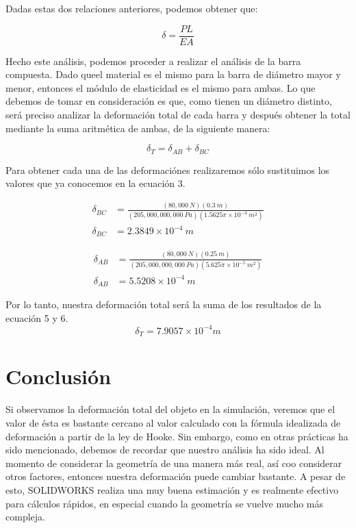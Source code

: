 \documentclass[12pt, letterpaper]{article}
\begin{document}
Dadas estas dos relaciones anteriores, podemos obtener que:

\begin{equation}
	\delta = \frac{PL}{EA}
\end{equation}

Hecho este análisis, podemos proceder a realizar el análisis de la barra compuesta. Dado queel material es el mismo para la barra de diámetro mayor y menor, entonces el módulo de elasticidad es el mismo para ambas. Lo que debemos de tomar en consideración es que, como tienen un diámetro distinto, será preciso analizar la deformación total de cada barra y después obtener la total mediante la suma aritmética de ambas, de la siguiente manera:

\begin{equation}
	\delta_T = \delta_{AB} + \delta_{BC}
\end{equation}

Para obtener cada una de las deformaciónes realizaremos sólo sustituimos los valores que ya conocemos en la ecuación 3.

\begin{equation}
	\begin{split}
		\delta_{BC} &= \frac{(80,000\ N)(0.3\ m)}{(205,000,000,000\ Pa)(1.5625\pi \times 10^{-4}\ m^2)}\\
		\delta_{BC} &= 2.3849 \times 10^{-4}\ m
	\end{split}
\end{equation}

\begin{equation}
	\begin{split}
		\delta_{AB} &= \frac{(80,000\ N)(0.25\ m)}{(205,000,000,000\ Pa)(5.625\pi \times 10^{-5}\ m^2)}\\
		\delta_{AB} &= 5.5208 \times 10^{-4}\ m
	\end{split}
\end{equation}

Por lo tanto, nuestra deformación total será la suma de los resultados de la ecuación 5 y 6.
\begin{equation}
	\boxed{\delta_T = 7.9057 \times 10^{-4} m}
\end{equation}

\section*{Conclusión}
Si observamos la deformación total del objeto en la simulación, veremos que el valor de ésta es bastante cercano al valor calculado con la fórmula idealizada de deformación a partir de la ley de Hooke. Sin embargo, como en otras prácticas ha sido mencionado, debemos de recordar que nuestro análisis ha sido ideal. Al momento de considerar la geometría de una manera más real, así coo considerar otros factores, entonces nuestra deformación puede cambiar bastante. A pesar de esto, SOLIDWORKS realiza una muy buena estimación y es realmente efectivo para cálculos rápidos, en especial cuando la geometría se vuelve mucho más compleja.

\renewcommand\refname{Referencias}
\printbibliography
\end{document}
